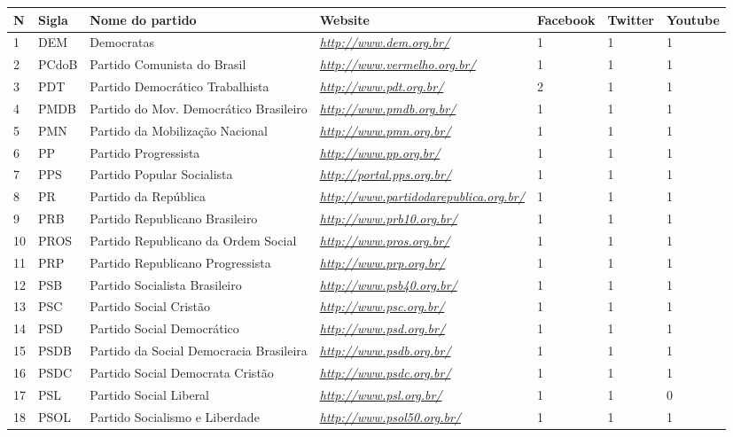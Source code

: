 \begin{longtable}[]{@{}lllllll@{}}
\toprule
\textbf{N} & \textbf{Sigla} & \textbf{Nome do partido} &
\textbf{Website} & Facebook & Twitter & Youtube\tabularnewline
\midrule
\endhead
1 & DEM & Democratas &
\href{http://www.dem.org.br/}{\emph{http://www.dem.org.br/}} & 1 & 1 &
1\tabularnewline
2 & PCdoB & Partido Comunista do Brasil &
\href{http://www.vermelho.org.br/}{\emph{http://www.vermelho.org.br/}} &
1 & 1 & 1\tabularnewline
3 & PDT & Partido Democrático Trabalhista &
\href{http://www.pdt.org.br/}{\emph{http://www.pdt.org.br/}} & 2 & 1 &
1\tabularnewline
4 & PMDB & Partido do Mov. Democrático Brasileiro &
\href{http://www.pmdb.org.br/}{\emph{http://www.pmdb.org.br/}} & 1 & 1 &
1\tabularnewline
5 & PMN & Partido da Mobilização Nacional &
\href{http://www.pmn.org.br/}{\emph{http://www.pmn.org.br/}} & 1 & 1 &
1\tabularnewline
6 & PP & Partido Progressista &
\href{http://www.pp.org.br/}{\emph{http://www.pp.org.br/}} & 1 & 1 &
1\tabularnewline
7 & PPS & Partido Popular Socialista &
\href{http://portal.pps.org.br/}{\emph{http://portal.pps.org.br/}} & 1 &
1 & 1\tabularnewline
8 & PR & Partido da República &
\href{http://www.partidodarepublica.org.br/}{\emph{http://www.partidodarepublica.org.br/}}
& 1 & 1 & 1\tabularnewline
9 & PRB & Partido Republicano Brasileiro &
\href{http://www.prb10.org.br/}{\emph{http://www.prb10.org.br/}} & 1 & 1
& 1\tabularnewline
10 & PROS & Partido Republicano da Ordem Social &
\href{http://www.pros.org.br/}{\emph{http://www.pros.org.br/}} & 1 & 1 &
1\tabularnewline
11 & PRP & Partido Republicano Progressista &
\href{http://www.prp.org.br/}{\emph{http://www.prp.org.br/}} & 1 & 1 &
1\tabularnewline
12 & PSB & Partido Socialista Brasileiro &
\href{http://www.psb40.org.br/}{\emph{http://www.psb40.org.br/}} & 1 & 1
& 1\tabularnewline
13 & PSC & Partido Social Cristão &
\href{http://www.psc.org.br/}{\emph{http://www.psc.org.br/}} & 1 & 1 &
1\tabularnewline
14 & PSD & Partido Social Democrático &
\href{http://www.psd.org.br/}{\emph{http://www.psd.org.br/}} & 1 & 1 &
1\tabularnewline
15 & PSDB & Partido da Social Democracia Brasileira &
\href{http://www.psdb.org.br/}{\emph{http://www.psdb.org.br/}} & 1 & 1 &
1\tabularnewline
16 & PSDC & Partido Social Democrata Cristão &
\href{http://www.psdc.org.br/}{\emph{http://www.psdc.org.br/}} & 1 & 1 &
1\tabularnewline
17 & PSL & Partido Social Liberal &
\href{http://www.psl.org.br/}{\emph{http://www.psl.org.br/}} & 1 & 1 &
0\tabularnewline
18 & PSOL & Partido Socialismo e Liberdade &
\href{http://www.psol50.org.br/}{\emph{http://www.psol50.org.br/}} & 1 &
1 & 1\tabularnewline

\end{longtable}
